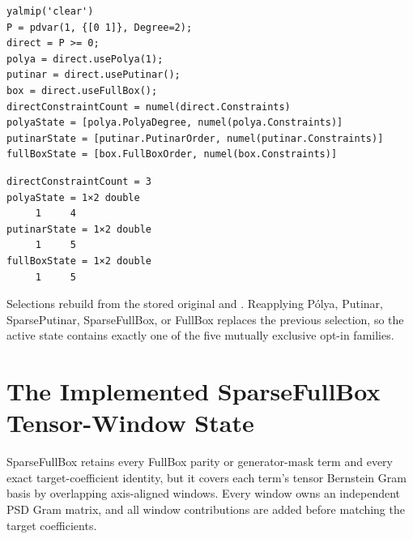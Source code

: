\begin{lstlisting}[style=dpmatlab]
yalmip('clear')
P = pdvar(1, {[0 1]}, Degree=2);
direct = P >= 0;
polya = direct.usePolya(1);
putinar = direct.usePutinar();
box = direct.useFullBox();
directConstraintCount = numel(direct.Constraints)
polyaState = [polya.PolyaDegree, numel(polya.Constraints)]
putinarState = [putinar.PutinarOrder, numel(putinar.Constraints)]
fullBoxState = [box.FullBoxOrder, numel(box.Constraints)]
\end{lstlisting}

\begin{lstlisting}[style=dpoutput]
directConstraintCount = 3
polyaState = 1×2 double
     1     4
putinarState = 1×2 double
     1     5
fullBoxState = 1×2 double
     1     5
\end{lstlisting}

Selections rebuild from the stored original  and . Reapplying P\'olya, Putinar, SparsePutinar, SparseFullBox, or FullBox replaces the previous selection, so the active state contains exactly one of the five mutually exclusive opt-in families.

\section{The Implemented SparseFullBox Tensor-Window State}
\label{sec:certificate-sparse-full-box}

SparseFullBox retains every FullBox parity or generator-mask term and every exact target-coefficient identity, but it covers each term's tensor Bernstein Gram basis by overlapping axis-aligned windows. Every window owns an independent PSD Gram matrix, and all window contributions are added before matching the target coefficients.

